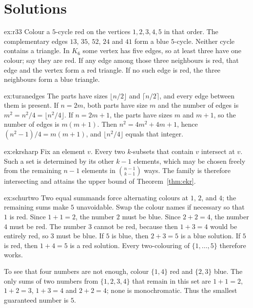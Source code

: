 \section{Solutions}

\begin{solution}{ex:r33}
\writeup Colour a $5$-cycle red on the vertices $1,2,3,4,5$ in that order. The complementary edges $13$, $35$, $52$, $24$ and $41$ form a blue $5$-cycle. Neither cycle contains a triangle. In $K_6$ some vertex has five edges, so at least three have one colour; say they are red. If any edge among those three neighbours is red, that edge and the vertex form a red triangle. If no such edge is red, the three neighbours form a blue triangle.
\end{solution}

\begin{solution}{ex:turanedges}
\writeup The parts have sizes $\lfloor n/2\rfloor$ and $\lceil n/2\rceil$, and every edge between them is present. If $n=2m$, both parts have size $m$ and the number of edges is $m^2=n^2/4=\lfloor n^2/4\rfloor$. If $n=2m+1$, the parts have sizes $m$ and $m+1$, so the number of edges is $m(m+1)$. Then $n^2=4m^2+4m+1$, hence $(n^2-1)/4=m(m+1)$, and $\lfloor n^2/4\rfloor$ equals that integer.
\end{solution}

\begin{solution}{ex:ekrsharp}
\writeup Fix an element $v$. Every two $k$-subsets that contain $v$ intersect at $v$. Such a set is determined by its other $k-1$ elements, which may be chosen freely from the remaining $n-1$ elements in $\binom{n-1}{k-1}$ ways. The family is therefore intersecting and attains the upper bound of Theorem~\ref{thm:ekr}.
\end{solution}

\begin{solution}{ex:schurtwo}
\idea Two equal summands force alternating colours at $1$, $2$, and $4$; the remaining sums make $5$ unavoidable.
\writeup Swap the colour names if necessary so that $1$ is red. Since $1+1=2$, the number $2$ must be blue. Since $2+2=4$, the number $4$ must be red. The number $3$ cannot be red, because then $1+3=4$ would be entirely red, so $3$ must be blue. If $5$ is blue, then $2+3=5$ is a blue solution. If $5$ is red, then $1+4=5$ is a red solution. Every two-colouring of $\{1,\ldots,5\}$ therefore works.

To see that four numbers are not enough, colour $\{1,4\}$ red and $\{2,3\}$ blue. The only sums of two numbers from $\{1,2,3,4\}$ that remain in this set are $1+1=2$, $1+2=3$, $1+3=4$ and $2+2=4$; none is monochromatic. Thus the smallest guaranteed number is $5$.
\end{solution}

